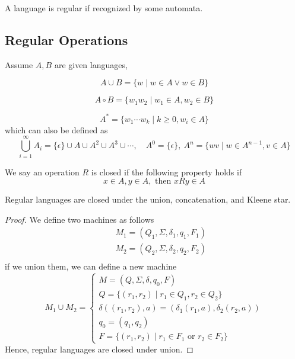 \begin{definition}
    A language is regular if recognized by some automata.
\end{definition}

\subsection{Regular Operations}

\begin{definition*}
Assume $A, B$ are given languages,
\begin{definition}[Union]
    \[
        A \cup B = \{ w \;|\; w \in A \lor w \in B \}
    \]
\end{definition}
\begin{definition}[Concatenation]
    \[
        A \circ B = \{ w_1w_2 \;|\; w_1 \in A, w_2 \in B \}
    \]
\end{definition}
\begin{definition}
    \[
        A^* = \{ w_1 \cdots w_k \;|\; k \geq 0, w_i \in A \}
    \]
    which can also be defined as
    \[
        \bigcup_{i=1}^\infty A_i = \{\epsilon\} \cup A \cup A^2 \cup A^3 \cup \cdots, \quad A^0 = \{\epsilon\}, \ A^n = \{wv \;|\; w \in A^{n-1}, v \in A\}
    \]
\end{definition}
\end{definition*}

\begin{definition}[closed]
    We say an operation $R$ is closed if the following property holds if
    \[
        x \in A, y \in A, \text{ then } xRy \in A
    \]
\end{definition}

\begin{theorem}
    Regular languages are closed under the union, concatenation, and Kleene star.
\end{theorem}
\begin{proof}
We define two machines as follows
\begin{eqnarray*}
    && M_1 =(Q_1, \Sigma, \delta_1, q_1, F_1)\\
    && M_2 =(Q_2, \Sigma, \delta_2, q_2, F_2)\\
\end{eqnarray*}
if we union them, we can define a new machine
\[
M_1 \cup M_2 = \begin{cases}
    M = (Q, \Sigma, \delta, q_0, F) \\
    Q = \{ (r_1, r_2) \;|\; r_1 \in Q_1, r_2 \in Q_2 \}\\
    \delta((r_1, r_2), a) = (\delta_1(r_1, a), \delta_2(r_2, a))\\
    q_0 = (q_1, q_2) \\
    F = \{ (r_1, r_2) \;|\; r_1 \in F_1 \text{ or } r_2 \in F_2 \}
\end{cases}
\]
Hence, regular languages are closed under union.
\end{proof}